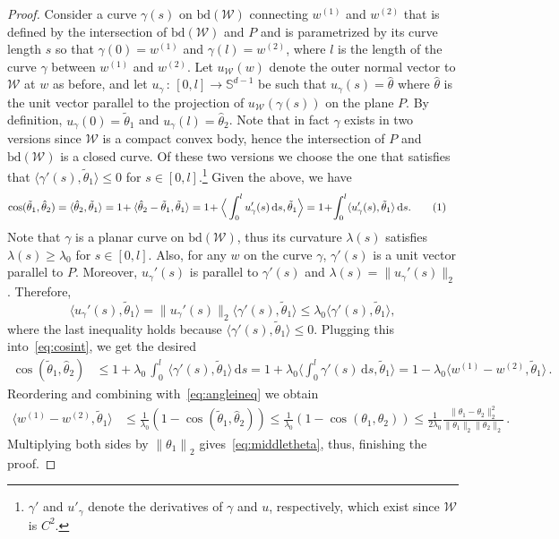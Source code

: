 \documentclass[english]{article}
\newcommand{\cW}{\mathcal{W}}
\newcommand{\bS}{\mathbb{S}}
\newcommand{\inpro}[2]{\langle #1, #2\rangle}
\newcommand{\ip}[1]{\langle#1\rangle}
\newcommand{\ttheta}{\tilde{\theta}}
\newcommand{\htheta}{\hat{\theta}}
\newcommand{\norm}[1]{\left\| #1 \right\|}
\newcommand{\bd}{\mathrm{bd}}
\newcommand{\inangle}[2]{(#1,#2)}
\newcommand\numberthis{\addtocounter{equation}{1}\tag{\theequation}}
\begin{document}
\begin{proof}
Consider a curve $\gamma(s)$ on $\bd(\cW)$ connecting $w^{(1)}$ and $w^{(2)}$ that is defined by the intersection of $\bd(\cW)$ and $P$ and is parametrized by its curve length $s$ so that $\gamma(0) = w^{(1)}$ and $\gamma(l) = w^{(2)}$,
where $l$ is the length of the curve $\gamma$ between $w^{(1)}$ and $w^{(2)}$.
Let $u_{\cW}(w)$ denote the outer normal vector to $\cW$ at $w$ as before,
and let $u_\gamma\, : \, [0,l]\rightarrow \bS^{d-1}$ be such that $u_\gamma(s) = \htheta$ where $\htheta$ is the unit vector parallel to the projection of $u_{\cW}(\gamma(s))$ on the plane $P$. 
By definition, $u_\gamma(0) = \ttheta_1$ and $u_\gamma(l) = \htheta_2$.
Note that in fact $\gamma$ exists in two versions since $\cW$ is a compact convex body,
hence the intersection of $P$ and $\bd(\cW)$ is a closed curve.
Of these two versions we choose the one that satisfies that $\ip{\gamma'(s),\ttheta_1}\le 0$ for $s\in [0,l]$.\footnote{$\gamma'$ and $u'_\gamma$ denote the derivatives of $\gamma$ and $u$, respectively, which exist since $\cW$ is $C^2$.}
Given the above, we have
\begin{align*}
\cos \inangle{\ttheta_1}{\htheta_2} & = \inpro{\htheta_2}{\ttheta_1} 
	 = 1 \! + \inpro{\htheta_2 - \ttheta_1}{\ttheta_1} 
	  = 1\!+ \Big\langle\int_{0}^{l} u_\gamma'(s)\,\text{d}s, \ttheta_1 \Big\rangle
	 = 1\!+ \!\int_{0}^{l} \inpro{u_\gamma'(s)}{\ttheta_1} \,\text{d}s. \numberthis \label{eq:cosint}
\end{align*}
Note that $\gamma$ is a planar curve on $\bd(\cW)$, 
thus its curvature $\lambda(s)$ satisfies $\lambda(s) \ge \lambda_0$ for $s\in [0,l]$.
Also, for any $w$ on the curve $\gamma$, $\gamma'(s)$ is a unit vector parallel to $P$. 
Moreover, $u_\gamma'(s)$ is parallel to $\gamma'(s)$ and $\lambda(s) = \|u_\gamma'(s)\|_2$.
Therefore, 
\[
\inpro{u_\gamma'(s)}{\ttheta_1} = \|u_\gamma'(s)\|_2\inpro{\gamma'(s)}{\ttheta_1} \le \lambda_0\inpro{\gamma'(s)}{\ttheta_1},
\]
where the last inequality holds because $\inpro{\gamma'(s)}{\ttheta_1} \le 0$.
Plugging this into~\eqref{eq:cosint}, we get the desired
\begin{align*}
\cos \inangle{\ttheta_1}{\htheta_2}   
	& \le 1+ \lambda_0\, \int_{0}^{l} \, \inpro{\gamma'(s)}{\ttheta_1}  \,\text{d}s 
	    = 1+ \lambda_0 \Big\langle\int_{0}^{l} \gamma'(s) \,\text{d}s, \ttheta_1 \Big\rangle
	  = 1 - \lambda_0 \inpro{w^{(1)}  - w^{(2)}}{\ttheta_1}\,.
\end{align*}
Reordering and combining with~\eqref{eq:angleineq} we obtain
\begin{align*}
\inpro{w^{(1)}  - w^{(2)}}{\ttheta_1} 
	& \le \frac{1}{\lambda_0} \left( 1- \cos \inangle{\ttheta_1}{\htheta_2} \right)
	 \le \frac{1}{\lambda_0} \left( 1- \cos \inangle{\theta_1}{\theta_2} \right) 
	 \le \frac{1}{2\lambda_0} \frac{\|\theta_1 - \theta_2\|_2^2}{\|\theta_1\|_2\|\theta_2\|_2}\,.
\end{align*}
Multiplying both sides by $\norm{\theta_1}_2$ gives~\eqref{eq:middletheta}, thus, finishing the proof.
\end{proof}
\end{document}
